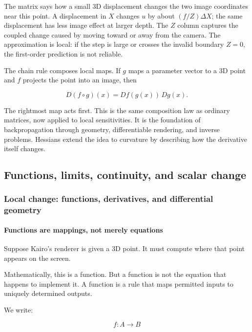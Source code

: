 The matrix says how a small 3D displacement changes the two image coordinates near this point. A displacement in \(X\) changes \(u\) by about \((f/Z)\Delta X\); the same displacement has less image effect at larger depth. The \(Z\) column captures the coupled change caused by moving toward or away from the camera. The approximation is local: if the step is large or crosses the invalid boundary \(Z=0\), the first-order prediction is not reliable.

The chain rule composes local maps. If \(g\) maps a parameter vector to a 3D point and \(f\) projects the point into an image, then

\[
D(f\circ g)(x)=Df(g(x))\,Dg(x).
\]

The rightmost map acts first. This is the same composition law as ordinary matrices, now applied to local sensitivities. It is the foundation of backpropagation through geometry, differentiable rendering, and inverse problems. Hessians extend the idea to curvature by describing how the derivative itself changes.

\subsection{Functions, limits, continuity, and scalar change}\label{01-foundations-i-ch020-functions-limits-continuity-and-scalar-change}

\subsubsection{Local change: functions, derivatives, and differential geometry}\label{01-foundations-i-ch020-local-change-functions-derivatives-and-differential-geometry}

\paragraph{Functions are mappings, not merely equations}\label{01-foundations-i-ch020-functions-are-mappings-not-merely-equations}

Suppose Kairo's renderer is given a 3D point. It must compute where that point appears on the screen.

Mathematically, this is a function. But a function is not the equation that happens to implement it. A function is a rule that maps permitted inputs to uniquely determined outputs.

We write:

\[
f:A\rightarrow B
\]

